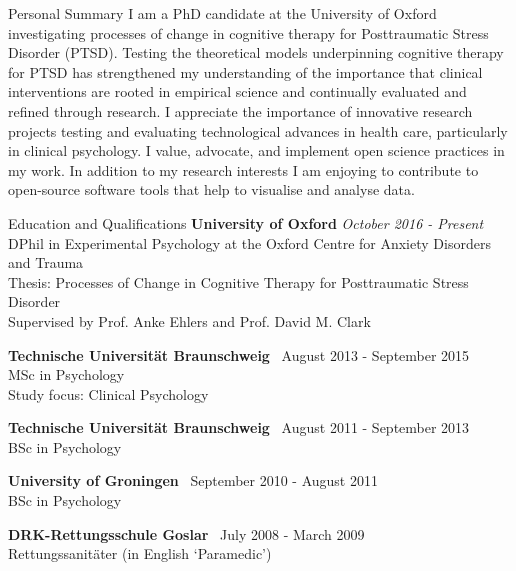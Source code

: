 \documentclass{resume} %
\begin{document}

\begin{rSection}{Personal Summary}
I am a PhD candidate at the University of Oxford investigating processes of change in cognitive therapy for Posttraumatic Stress Disorder (PTSD).
Testing the theoretical models underpinning cognitive therapy for PTSD has strengthened my understanding of the importance that clinical interventions are rooted in empirical science and continually evaluated and refined through research.
I appreciate the importance of innovative research projects testing and evaluating technological advances in health care, particularly in clinical psychology.
I value, advocate, and implement open science practices in my work.
In addition to my research interests I am enjoying to contribute to open-source software tools that help to visualise and analyse data.

\end{rSection}


\begin{rSection}{Education and Qualifications}
{\bf University of Oxford} \hfill {\em October 2016 - Present} \\ 
DPhil in Experimental Psychology at the Oxford Centre for Anxiety Disorders and Trauma \smallskip \\
Thesis: Processes of Change in Cognitive Therapy for Posttraumatic Stress Disorder \\
Supervised by Prof. Anke Ehlers and Prof. David M. Clark \smallskip

{\bf Technische Universit{\"a}t Braunschweig} \hfill {\ August 2013 - September 2015} \\ 
MSc in Psychology \\
Study  focus: Clinical Psychology \smallskip

{\bf Technische Universit{\"a}t Braunschweig} \hfill {\ August 2011 - September 2013} \\ 
BSc in Psychology \smallskip

{\bf University of Groningen} \hfill {\ September 2010 - August 2011} \\ 
BSc in Psychology \smallskip

{\bf DRK-Rettungsschule Goslar} \hfill {\ July 2008 - March 2009} \\ 
Rettungssanit{\"a}ter (in English `Paramedic') \smallskip

\end{rSection}
\end{document}
